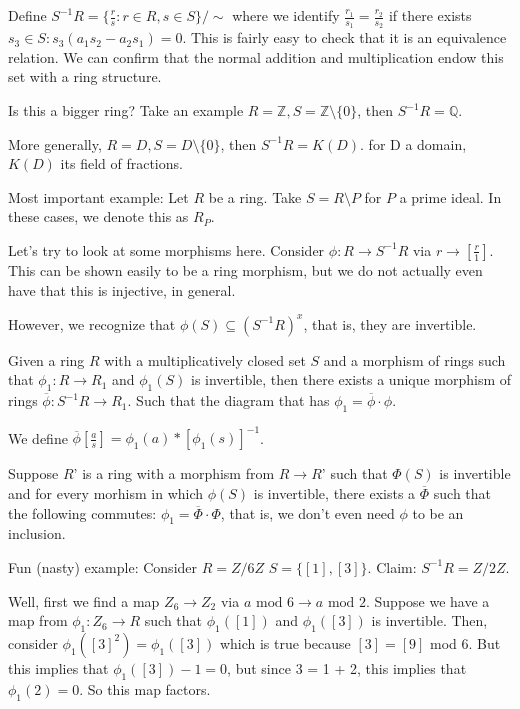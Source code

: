 \documentclass[10pt]{article}
\begin{document}
Define $S^{-1}R = \{ \frac{r}{s} : r \in R, s \in S \}/ \sim $ where we identify $\frac{ r_1}{s_1} = \frac{r_2}{s_2}$ if there exists $ s_3 \in S : s_3(a_1s_2 - a_2s_1) = 0$. This is fairly easy to check that it is an equivalence relation. We can confirm that the normal addition and multiplication endow this set with a ring structure.

Is this a bigger ring? Take an example $ R= \mathbb{Z}, S = \mathbb{Z} \setminus \{ 0 \}$, then $S^{-1}R = \mathbb{Q}$.

More generally, $ R= D, S = D \setminus \{ 0 \}$, then $S^{-1}R = K(D)$. for D a domain, $K(D)$ its field of fractions.

Most important example: Let $R$ be a ring. Take $S = R \setminus P$ for $P$ a prime ideal. In these cases, we denote this as $R_P$.

Let’s try to look at some morphisms here. Consider $\phi: R \to S^{-1} R$ via $r \to [\frac{r}{1}] $. This can be shown easily to be a ring morphism, but we do not actually even have that this is injective, in general.

However, we recognize that $\phi(S) \subseteq (S^{-1}R)^x$, that is, they are invertible.

Given a ring $R$ with a multiplicatively closed set $S$ and a morphism of rings such that $\phi_1: R \to R_1$ and $\phi_1(S)$ is invertible, then there exists a unique morphism of rings $\overline{\phi}: S^{-1} R \to R_1$. Such that the diagram that has $\phi_1 = \overline{\phi} \cdot \phi$.

We define $\overline{\phi}[\frac{a}{s}] = \phi_1(a) * [\phi_1(s)]^{-1}$.

Suppose $R’$ is a ring with a morphism from $R \to R’$ such that $\Phi(S)$ is invertible and for every morhism in which $\phi(S)$ is invertible, there exists a $\overline{\Phi}$ such that the following commutes: $\phi_1 = \overline{\Phi} \cdot \Phi$, that is, we don’t even need $\phi$ to be an inclusion.

Fun (nasty) example: Consider $R = Z/6Z$ $S = \{ [1], [3] \}$. Claim: $S^{-1}R = Z/2Z$.

Well, first we find a map $Z_6 \to Z_2$ via $a \text{ mod }  6 \to a \text{ mod } 2$. Suppose we have a map from $\phi_1: Z_6 \to R$ such that $\phi_1([1])$ and $\phi_1([3])$ is invertible. Then, consider $\phi_1([3]^2) = \phi_1([3])$ which is true because $[3] = [9]$ mod 6. But this implies that $\phi_1([3]) -1 = 0$, but since 3 = 1 + 2, this implies that $\phi_1(2) = 0$. So this map factors. 
\end{document}

